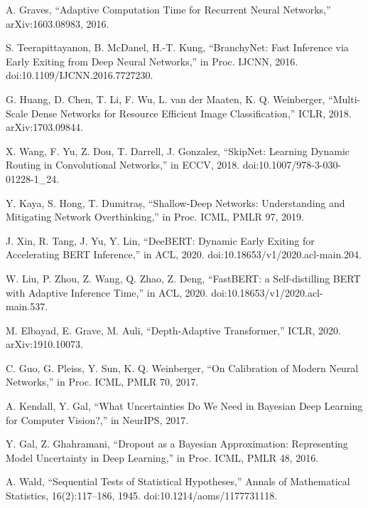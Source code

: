 \begin{thebibliography}{99}

A. Graves, ``Adaptive Computation Time for Recurrent Neural Networks,'' arXiv:1603.08983, 2016.

S. Teerapittayanon, B. McDanel, H.-T. Kung, ``BranchyNet: Fast Inference via Early Exiting from Deep Neural Networks,'' in Proc. IJCNN, 2016. doi:10.1109/IJCNN.2016.7727230.

G. Huang, D. Chen, T. Li, F. Wu, L. van der Maaten, K. Q. Weinberger, ``Multi-Scale Dense Networks for Resource Efficient Image Classification,'' ICLR, 2018. arXiv:1703.09844.

X. Wang, F. Yu, Z. Dou, T. Darrell, J. Gonzalez, ``SkipNet: Learning Dynamic Routing in Convolutional Networks,'' in ECCV, 2018. doi:10.1007/978-3-030-01228-1\_24.

Y. Kaya, S. Hong, T. Dumitraș, ``Shallow-Deep Networks: Understanding and Mitigating Network Overthinking,'' in Proc. ICML, PMLR 97, 2019.

J. Xin, R. Tang, J. Yu, Y. Lin, ``DeeBERT: Dynamic Early Exiting for Accelerating BERT Inference,'' in ACL, 2020. doi:10.18653/v1/2020.acl-main.204.

W. Liu, P. Zhou, Z. Wang, Q. Zhao, Z. Deng, ``FastBERT: a Self-distilling BERT with Adaptive Inference Time,'' in ACL, 2020. doi:10.18653/v1/2020.acl-main.537.

M. Elbayad, E. Grave, M. Auli, ``Depth-Adaptive Transformer,'' ICLR, 2020. arXiv:1910.10073.

C. Guo, G. Pleiss, Y. Sun, K. Q. Weinberger, ``On Calibration of Modern Neural Networks,'' in Proc. ICML, PMLR 70, 2017.

A. Kendall, Y. Gal, ``What Uncertainties Do We Need in Bayesian Deep Learning for Computer Vision?,'' in NeurIPS, 2017.

Y. Gal, Z. Ghahramani, ``Dropout as a Bayesian Approximation: Representing Model Uncertainty in Deep Learning,'' in Proc. ICML, PMLR 48, 2016.

A. Wald, ``Sequential Tests of Statistical Hypotheses,'' Annals of Mathematical Statistics, 16(2):117--186, 1945. doi:10.1214/aoms/1177731118.


\end{thebibliography}

